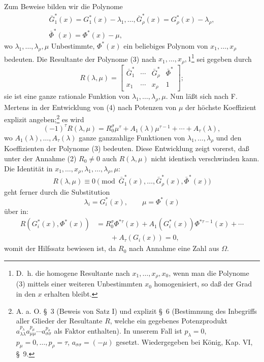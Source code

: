 \documentclass[11pt]{article}
\begin{document}
Zum Beweise bilden wir die Polynome
\begin{equation}
\begin{gathered}
  \bar G_1^*(x)=G_1^*(x)-\lambda_1,
  \ldots,
  \bar G_\rho^*(x)=G_\rho^*(x)-\lambda_\rho,\\
  \bar\Phi^*(x)=\Phi^*(x)-\mu,
\end{gathered}
\tag{3}
\end{equation}
wo $\lambda_1,
\ldots,\lambda_\rho,\mu$ Unbestimmte, $\Phi^*(x)$ ein beliebiges Polynom von $x_1,
\ldots,x_\rho$ bedeuten. Die Resultante der Polynome (3) nach $x_1,
\ldots,x_\rho,1$\footnote{D.~h. die homogene Resultante nach $x_1,
\ldots,x_\rho,x_0$, wenn man die Polynome (3) mittels einer weiteren Unbestimmten $x_0$ homogenisiert, so daß der Grad in den $x$ erhalten bleibt.} sei gegeben durch
\begin{equation}
  R(\lambda,\mu)=\left[
  \begin{array}{cccc}
   \bar G_1^*&\cdots&\bar G_\rho^*&\bar\Phi^*\\
   x_1&\cdots&x_\rho&1
  \end{array}
  \right];
\tag{4}
\end{equation}
sie ist eine ganze rationale Funktion von $\lambda_1,
\ldots,\lambda_\rho,\mu$. Nun läßt sich nach F. Mertens in der Entwicklung von (4) nach Potenzen von $\mu$ der höchste Koeffizient explizit angeben;\footnote{A. a. O. \S\ 3 (Beweis von Satz I) und explizit \S\ 6 (Bestimmung des Inbegriffs aller Glieder der Resultante $R$, welche ein gegebenes Potenzprodukt $a_{\lambda\lambda}^{p_\lambda} a_{\mu\mu}^{p_\mu}\cdots a_{\sigma\sigma}^{p_\sigma}$ als Faktor enthalten). In unserem Fall ist $p_\lambda=0$, $p_\mu=0,\ldots,p_\rho=\tau$, $a_{\sigma\sigma}=(-\mu)$ gesetzt. Wiedergegeben bei König, Kap. VI, \S\ 9.} es wird
\begin{equation}
  (-1)^\tau R(\lambda,\mu)
  =R_0^\sigma\mu^\tau+A_1(\lambda)\mu^{\tau-1}+\cdots+A_\tau(\lambda),
\tag{5}
\end{equation}
wo $A_1(\lambda),\ldots,A_\tau(\lambda)$ ganze ganzzahlige Funktionen von $\lambda_1,
\ldots,\lambda_\rho$ und den Koeffizienten der Polynome (3) bedeuten. Diese Entwicklung zeigt vorerst, daß unter der Annahme (2) $R_0\ne0$ auch $R(\lambda,
\mu)$ nicht identisch verschwinden kann. Die Identität in $x_1,
\ldots,x_\rho,
\lambda_1,
\ldots,
\lambda_\rho,
\mu$:
\[
  R(\lambda,
\mu)\equiv 0\pmod{\bar G_1^*(x),\ldots,
\bar G_\rho^*(x),\bar\Phi^*(x)}
\]
geht ferner durch die Substitution
\[
  \lambda_i=G_i^*(x),\qquad \mu=\Phi^*(x)
\]
über in:
\begin{equation}
\begin{aligned}
  R(G_i^*(x),\Phi^*(x))
  &=R_0^\sigma\Phi^{*\tau}(x)
    +A_1(G_i^*(x))\Phi^{*\tau-1}(x)+\cdots \\
  &\qquad +A_\tau(G_i(x))=0,
\end{aligned}
\tag{6}
\end{equation}
womit der Hilfssatz bewiesen ist, da $R_0$ nach Annahme eine Zahl aus $\Omega$.
\end{document}
